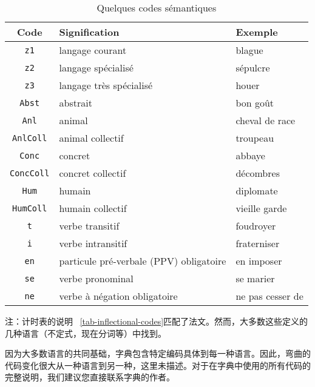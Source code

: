 \begin{table}[!h]
\begin{center}
\begin{tabular}{|c|l|l|}
\hline
\textbf{Code} & \textbf{Signification} & \textbf{Exemple} \\
\hline
\verb+z1+ & langage courant & blague \\
\hline
\verb+z2+ & langage spécialisé & sépulcre \\
\hline
\verb+z3+ & langage très spécialisé & houer \\
\hline
\verb+Abst+ & abstrait & bon goût \\
\hline
\verb+Anl+ & animal & cheval de race \\
\hline
\verb+AnlColl+ & animal collectif & troupeau \\
\hline
\verb+Conc+ & concret & abbaye \\
\hline
\verb+ConcColl+ & concret collectif & décombres \\
\hline
\verb+Hum+ & humain & diplomate \\
\hline
\verb+HumColl+ & humain collectif & vieille garde \\
\hline
\verb+t+ & verbe transitif & foudroyer \\
\hline
\verb+i+ & verbe intransitif & fraterniser \\
\hline
\verb+en+ & particule pré-verbale (PPV) obligatoire & en imposer \\
\hline
\verb+se+ & verbe pronominal & se marier \\
\hline
\verb+ne+ & verbe à négation obligatoire & ne pas cesser de \\
\hline
\end{tabular}
\caption{Quelques codes sémantiques\label{tab-semantic-codes}}
\end{center}
\end{table}

\noindent 注：计时表的说明 ~\ref{tab-inflectional-codes}匹配了法文。然而，大多数这些定义的几种语言（不定式，现在分词等）中找到。


\bigskip
\noindent 因为大多数语言的共同基础，字典包含特定编码具体到每一种语言。因此，弯曲的代码变化很大从一种语言到另一种，这里未描述。对于在字典中使用的所有代码的完整说明，我们建议您直接联系字典的作者。


